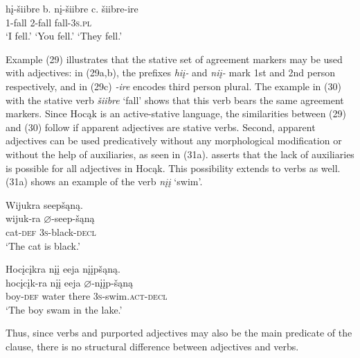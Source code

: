 \documentclass[output=paper]{LSP/langsci}
\begin{document}
\begin{exe}
\ex
\begin{xlist}
\ex \gll
hį-šiibre \hspace{30pt}  b. {} nį-šiibre \hspace{43pt} c. {} šiibre-ire\\
1-fall {} {} {} 2-fall {} {} {} fall-\textsc{3s.pl}\\
\glt `I fell.' \hspace{2cm} `You fell.'  \hspace{1.7cm} `They fell.'


\end{xlist}
\end{exe}

Example (29) illustrates that the stative set of agreement markers may be used with adjectives: in (29a,b), the prefixes \textit{hiį-} and \textit{niį-} mark 1st and 2nd person respectively, and in (29c) \textit{-ire} encodes third person plural. The example in (30) with the stative verb \textit{šiibre} `fall' shows that this verb bears the same agreement markers. Since Hocąk is an active-stative language, the similarities between (29) and (30) follow if apparent adjectives are stative verbs. Second, apparent adjectives can be used predicatively without any morphological modification or without the help of auxiliaries, as seen in (31a). \citet{Helmbrecht2006} asserts that the lack of auxiliaries is possible for all adjectives in Hocąk. This possibility extends to verbs as well. (31a) shows an example of the verb \textit{nįį} `swim'.

\begin{exe}
\ex
\begin{xlist}

\ex \glll Wijukra seepšąną. \\
wijuk-ra {$\varnothing$}-seep-šąną\\
cat-\textsc{def} \textsc{3s}-black-\textsc{decl}\\
\glt `The cat is black.'


\ex \glll Hocįcįkra nįį eeja nįįpšąną.\\
hocįcįk-ra nįį eeja {$\varnothing$}-nįįp-šąną\\
boy-\textsc{def} water there \textsc{3s}-swim.\textsc{act}-\textsc{decl}\\
\glt `The boy swam in the lake.'

\end{xlist}
\end{exe}


Thus, since verbs and purported adjectives may also be the main predicate of the clause, there is no structural difference between adjectives and verbs.
\end{document}
